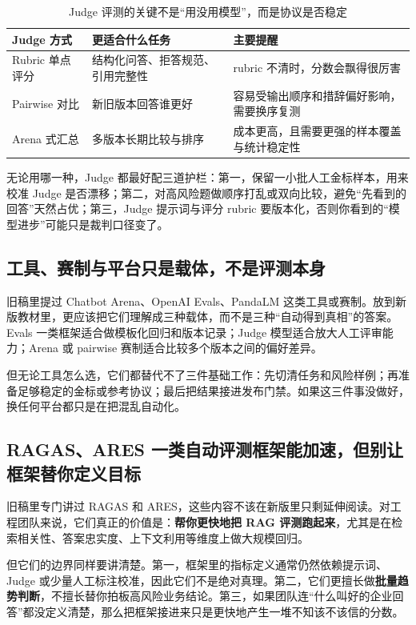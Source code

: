 \begin{table}[H]
\centering
\small
\begin{tabularx}{\textwidth}{>{\raggedright\arraybackslash}p{3cm}>{\raggedright\arraybackslash}p{3cm}>{\raggedright\arraybackslash}X}
\toprule
\textbf{Judge 方式} & \textbf{更适合什么任务} & \textbf{主要提醒} \\
\midrule
Rubric 单点评分 & 结构化问答、拒答规范、引用完整性 & rubric 不清时，分数会飘得很厉害 \\
Pairwise 对比 & 新旧版本回答谁更好 & 容易受输出顺序和措辞偏好影响，需要换序复测 \\
Arena 式汇总 & 多版本长期比较与排序 & 成本更高，且需要更强的样本覆盖与统计稳定性 \\
\bottomrule
\end{tabularx}
\caption{Judge 评测的关键不是“用没用模型”，而是协议是否稳定}
\label{tab:judge-modes}
\end{table}

无论用哪一种，Judge 都最好配三道护栏：第一，保留一小批人工金标样本，用来校准 Judge 是否漂移；第二，对高风险题做顺序打乱或双向比较，避免“先看到的回答”天然占优；第三，Judge 提示词与评分 rubric 要版本化，否则你看到的“模型进步”可能只是裁判口径变了。

\subsection{工具、赛制与平台只是载体，不是评测本身}
旧稿里提过 Chatbot Arena、OpenAI Evals、PandaLM 这类工具或赛制。放到新版教材里，更应该把它们理解成三种载体，而不是三种“自动得到真相”的答案。Evals 一类框架适合做模板化回归和版本记录；Judge 模型适合放大人工评审能力；Arena 或 pairwise 赛制适合比较多个版本之间的偏好差异。

但无论工具怎么选，它们都替代不了三件基础工作：先切清任务和风险样例；再准备足够稳定的金标或参考协议；最后把结果接进发布门禁。如果这三件事没做好，换任何平台都只是在把混乱自动化。

\subsection{RAGAS、ARES 一类自动评测框架能加速，但别让框架替你定义目标}
旧稿里专门讲过 RAGAS 和 ARES，这些内容不该在新版里只剩延伸阅读。对工程团队来说，它们真正的价值是：\textbf{帮你更快地把 RAG 评测跑起来}，尤其是在检索相关性、答案忠实度、上下文利用等维度上做大规模回归。

但它们的边界同样要讲清楚。第一，框架里的指标定义通常仍然依赖提示词、Judge 或少量人工标注校准，因此它们不是绝对真理。第二，它们更擅长做\textbf{批量趋势判断}，不擅长替你拍板高风险业务结论。第三，如果团队连“什么叫好的企业回答”都没定义清楚，那么把框架接进来只是更快地产生一堆不知该不该信的分数。

